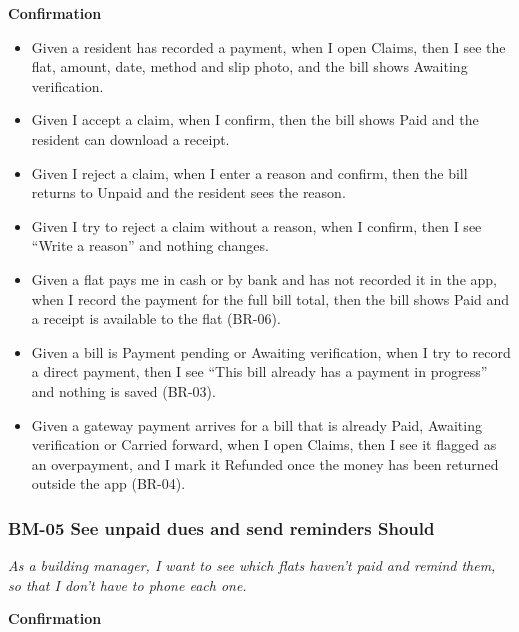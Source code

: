 \documentclass[11pt,a4paper]{report}
\begin{document}
\medskip\noindent\textbf{Confirmation}\par

\begin{itemize}
  \item Given a resident has recorded a payment, when I open Claims, then I see the flat, amount, date, method and slip photo, and the bill shows Awaiting verification.
  \item Given I accept a claim, when I confirm, then the bill shows Paid and the resident can download a receipt.
  \item Given I reject a claim, when I enter a reason and confirm, then the bill returns to Unpaid and the resident sees the reason.
  \item Given I try to reject a claim without a reason, when I confirm, then I see ``Write a reason'' and nothing changes.
  \item Given a flat pays me in cash or by bank and has not recorded it in the app, when I record the payment for the full bill total, then the bill shows Paid and a receipt is available to the flat (BR-06).
  \item Given a bill is Payment pending or Awaiting verification, when I try to record a direct payment, then I see ``This bill already has a payment in progress'' and nothing is saved (BR-03).
  \item Given a gateway payment arrives for a bill that is already Paid, Awaiting verification or Carried forward, when I open Claims, then I see it flagged as an overpayment, and I mark it Refunded once the money has been returned outside the app (BR-04).
\end{itemize}

\subsubsection*{BM-05 \textperiodcentered{} See unpaid dues and send reminders \textperiodcentered{} Should}

\emph{As a building manager, I want to see which flats haven't paid and remind them, so that I don't have to phone each one.}

\medskip\noindent\textbf{Confirmation}\par
\end{document}
